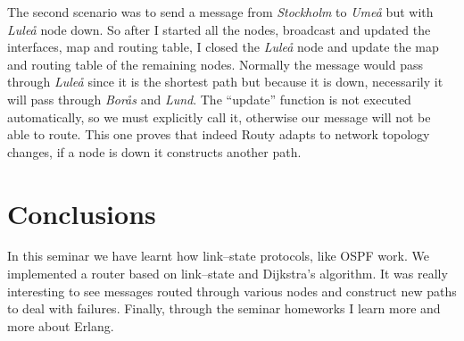 \documentclass[a4paper, 11pt]{article}
\begin{document}
The second scenario was to send a message from \emph{Stockholm} to \emph{Ume\aa}
but with \emph{Lule\aa} node down. So after I started all the nodes, broadcast and
updated the interfaces, map and routing table, I closed the \emph{Lule\aa} node
and update the map and routing table of the remaining nodes. Normally the message
would pass through \emph{Lule\aa} since it is the shortest path but because
it is down, necessarily it will pass through \emph{Bor\aa s} and \emph{Lund}.
The ``update'' function is not executed automatically, so we must explicitly
call it, otherwise our message will not be able to route. This one proves that
indeed Routy adapts to network topology changes, if a node is down it constructs
another path.

\section{Conclusions}

In this seminar we have learnt how link--state protocols, like OSPF work. We
implemented a router based on link--state and Dijkstra's algorithm. It was
really interesting to see messages routed through various nodes and construct new
paths to deal with failures. Finally, through the seminar homeworks I learn more
and more about Erlang.
\end{document}
